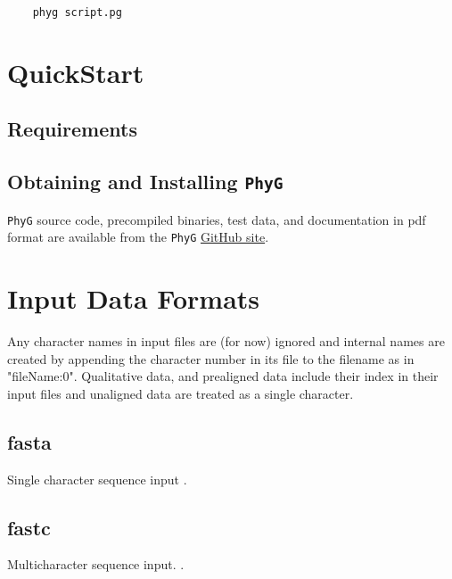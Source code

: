 \documentclass[11pt]{article}
\begin{document}
	\begin{verbatim}
	phyg script.pg
	\end{verbatim}
	
	\section{QuickStart}
		\subsection{Requirements}
		\subsection{Obtaining and Installing \texttt{PhyG}}
		\texttt{PhyG} source code, precompiled binaries, test data, and documentation in pdf format are available from the	\texttt{PhyG} \href{https://githib.com/wardwheeler/PhyGraph}{GitHub site}.

	\section{Input Data Formats}
		Any character names in input files are (for now) ignored and internal names are created
		by appending the character number in its file to the filename as in "fileName:0".
		Qualitative data, and prealigned data include their index in their input files and unaligned 
		data are treated as a single character.
		
		\subsection{fasta}
			Single character sequence input \citep{PearsonandLipman1988}.
		\subsection{fastc}
			Multicharacter sequence input.  \citep{WheelerandWashburn2019}.
\end{document}

